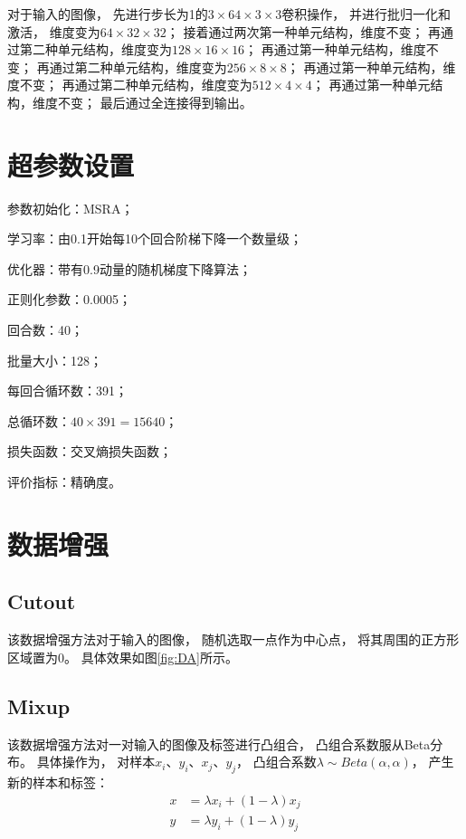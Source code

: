 \documentclass{article}
\begin{document}
对于输入的图像，
先进行步长为1的$3\times64\times3\times3$卷积操作，
并进行批归一化和激活，
维度变为$64\times32\times32$；
接着通过两次第一种单元结构，维度不变；
再通过第二种单元结构，维度变为$128\times16\times16$；
再通过第一种单元结构，维度不变；
再通过第二种单元结构，维度变为$256\times8\times8$；
再通过第一种单元结构，维度不变；
再通过第二种单元结构，维度变为$512\times4\times4$；
再通过第一种单元结构，维度不变；
最后通过全连接得到输出。

\section{超参数设置}

参数初始化：MSRA；

学习率：由0.1开始每10个回合阶梯下降一个数量级；

优化器：带有0.9动量的随机梯度下降算法；

正则化参数：0.0005；

回合数：40；

批量大小：128；

每回合循环数：391；

总循环数：$ 40 \times 391 = 15640$；

损失函数：交叉熵损失函数；

评价指标：精确度。

\section{数据增强}

\subsection{Cutout}

该数据增强方法对于输入的图像，
随机选取一点作为中心点，
将其周围的正方形区域置为0。
具体效果如图\ref{fig:DA}所示。

\subsection{Mixup}

该数据增强方法对一对输入的图像及标签进行凸组合，
凸组合系数服从Beta分布。
具体操作为，
对样本$x_i$、$y_i$、$x_j$、$y_j$，
凸组合系数$\lambda \sim Beta(\alpha, \alpha)$，
产生新的样本和标签：
\begin{align*}
x &= \lambda x_i + (1 - \lambda) x_j \\
y &= \lambda y_i + (1 - \lambda) y_j
\end{align*}
\end{document}

